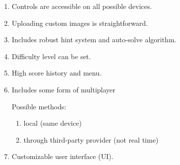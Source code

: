 \begin{enumerate}
  \item Controls are accessible on all possible devices.
  \item Uploading custom images is straightforward.
  \item Includes robust hint system and auto-solve algorithm.
  \item Difficulty level can be set.
  \item High score history and menu.
  \item Includes some form of multiplayer

    Possible methods:
    \begin{enumerate}
      \item local (same device)
      \item through third-party provider (not real time)
    \end{enumerate}
  \item Customizable user interface (UI).
\end{enumerate}
